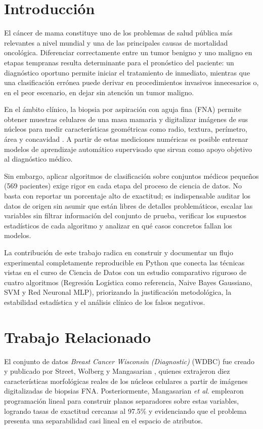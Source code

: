 \documentclass[conference]{IEEEtran}
\begin{document}
\section{Introducción}

El cáncer de mama constituye uno de los problemas de salud pública más relevantes a nivel mundial y una de las principales causas de mortalidad oncológica. Diferenciar correctamente entre un tumor benigno y uno maligno en etapas tempranas resulta determinante para el pronóstico del paciente: un diagnóstico oportuno permite iniciar el tratamiento de inmediato, mientras que una clasificación errónea puede derivar en procedimientos invasivos innecesarios o, en el peor escenario, en dejar sin atención un tumor maligno.

En el ámbito clínico, la biopsia por aspiración con aguja fina (FNA) permite obtener muestras celulares de una masa mamaria y digitalizar imágenes de sus núcleos para medir características geométricas como radio, textura, perímetro, área y concavidad \cite{street1993}. A partir de estas mediciones numéricas es posible entrenar modelos de aprendizaje automático supervisado que sirvan como apoyo objetivo al diagnóstico médico.

Sin embargo, aplicar algoritmos de clasificación sobre conjuntos médicos pequeños (569 pacientes) exige rigor en cada etapa del proceso de ciencia de datos. No basta con reportar un porcentaje alto de exactitud; es indispensable auditar los datos de origen sin asumir que están libres de detalles problemáticos, escalar las variables sin filtrar información del conjunto de prueba, verificar los supuestos estadísticos de cada algoritmo y analizar en qué casos concretos fallan los modelos.

La contribución de este trabajo radica en construir y documentar un flujo experimental completamente reproducible en Python que conecta las técnicas vistas en el curso de Ciencia de Datos con un estudio comparativo riguroso de cuatro algoritmos (Regresión Logística como referencia, Naive Bayes Gaussiano, SVM y Red Neuronal MLP), priorizando la justificación metodológica, la estabilidad estadística y el análisis clínico de los falsos negativos.

\section{Trabajo Relacionado}

El conjunto de datos \textit{Breast Cancer Wisconsin (Diagnostic)} (WDBC) fue creado y publicado por Street, Wolberg y Mangasarian \cite{street1993}, quienes extrajeron diez características morfológicas reales de los núcleos celulares a partir de imágenes digitalizadas de biopsias FNA. Posteriormente, Mangasarian \textit{et al.} \cite{mangasarian1995} emplearon programación lineal para construir planos separadores sobre estas variables, logrando tasas de exactitud cercanas al 97.5\% y evidenciando que el problema presenta una separabilidad casi lineal en el espacio de atributos.
\end{document}

